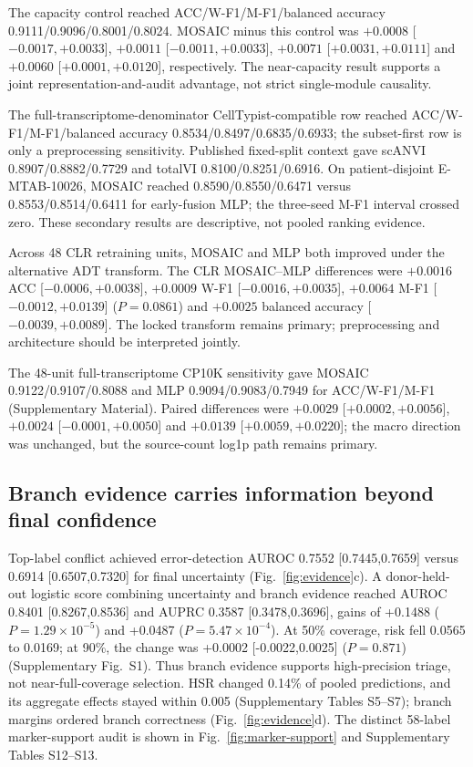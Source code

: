 \documentclass[unnumsec,webpdf,contemporary,large,numbered]{oup-authoring-template}
\begin{document}
The capacity control reached ACC/W-F1/M-F1/balanced accuracy 0.9111/0.9096/0.8001/0.8024. MOSAIC minus this control was $+0.0008$ [$-0.0017,+0.0033$], $+0.0011$ [$-0.0011,+0.0033$], $+0.0071$ [$+0.0031,+0.0111$] and $+0.0060$ [$+0.0001,+0.0120$], respectively. The near-capacity result supports a joint representation-and-audit advantage, not strict single-module causality.

The full-transcriptome-denominator CellTypist-compatible row reached ACC/W-F1/M-F1/balanced accuracy 0.8534/0.8497/0.6835/0.6933; the subset-first row is only a preprocessing sensitivity. Published fixed-split context gave scANVI 0.8907/0.8882/0.7729 and totalVI 0.8100/0.8251/0.6916. On patient-disjoint E-MTAB-10026, MOSAIC reached 0.8590/0.8550/0.6471 versus 0.8553/0.8514/0.6411 for early-fusion MLP; the three-seed M-F1 interval crossed zero. These secondary results are descriptive, not pooled ranking evidence.

Across 48 CLR retraining units, MOSAIC and MLP both improved under the alternative ADT transform. The CLR MOSAIC--MLP differences were $+0.0016$ ACC [$-0.0006,+0.0038$], $+0.0009$ W-F1 [$-0.0016,+0.0035$], $+0.0064$ M-F1 [$-0.0012,+0.0139$] ($P=0.0861$) and $+0.0025$ balanced accuracy [$-0.0039,+0.0089$]. The locked transform remains primary; preprocessing and architecture should be interpreted jointly.

The 48-unit full-transcriptome CP10K sensitivity gave MOSAIC 0.9122/0.9107/0.8088 and MLP 0.9094/0.9083/0.7949 for ACC/W-F1/M-F1 (Supplementary Material). Paired differences were $+0.0029$ [$+0.0002,+0.0056$], $+0.0024$ [$-0.0001,+0.0050$] and $+0.0139$ [$+0.0059,+0.0220$]; the macro direction was unchanged, but the source-count log1p path remains primary.

\subsection{Branch evidence carries information beyond final confidence}

Top-label conflict achieved error-detection AUROC 0.7552 [0.7445,0.7659] versus 0.6914 [0.6507,0.7320] for final uncertainty (Fig.~\ref{fig:evidence}c). A donor-held-out logistic score combining uncertainty and branch evidence reached AUROC 0.8401 [0.8267,0.8536] and AUPRC 0.3587 [0.3478,0.3696], gains of +0.1488 ($P=1.29\times10^{-5}$) and +0.0487 ($P=5.47\times10^{-4}$). At 50\% coverage, risk fell 0.0565 to 0.0169; at 90\%, the change was +0.0002 [-0.0022,0.0025] ($P=0.871$) (Supplementary Fig.~S1). Thus branch evidence supports high-precision triage, not near-full-coverage selection. HSR changed 0.14\% of pooled predictions, and its aggregate effects stayed within 0.005 (Supplementary Tables S5--S7); branch margins ordered branch correctness (Fig.~\ref{fig:evidence}d). The distinct 58-label marker-support audit is shown in Fig.~\ref{fig:marker-support} and Supplementary Tables S12--S13.
\end{document}
